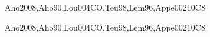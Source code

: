 \begin{syllabus}
\begin{unit}{\PLLanguageTranslationandExecution}{}{Aho2008,Aho90,Lou004CO,Teu98,Lem96,Appe002}{10}{C8}
\begin{topics}%
	\item \PLLanguageTranslationandExecutionTopicInterpretation
	\item \PLLanguageTranslationandExecutionTopicLanguage
	\item \PLLanguageTranslationandExecutionTopicRun
	\item \PLLanguageTranslationandExecutionTopicRunTime
	\item \PLLanguageTranslationandExecutionTopicMemory
\end{topics}
\begin{learningoutcomes}
	\item \PLLanguageTranslationandExecutionLODistinguishA [\Assessment]
	\item \PLLanguageTranslationandExecutionLODistinguishSyntax [\Assessment]
	\item \PLLanguageTranslationandExecutionLOSketch [\Assessment]
	\item \PLLanguageTranslationandExecutionLOExplainHowImplementations [\Assessment]
	\item \PLLanguageTranslationandExecutionLOIdentifyAndLeaks [\Assessment]
	\item \PLLanguageTranslationandExecutionLODiscussTheLimitations [\Assessment]
\end{learningoutcomes}
\end{unit}

\begin{unit}{\PLSyntaxAnalysis}{}{Aho2008,Aho90,Lou004CO,Teu98,Lem96,Appe002}{10}{C8}
\begin{topics}%
	\item \PLSyntaxAnalysisTopicScanning
	\item \PLSyntaxAnalysisTopicParsing
	\item \PLSyntaxAnalysisTopicGenerating
\end{topics}
\begin{learningoutcomes}
  	\item \PLSyntaxAnalysisLOUseFormalSpecify [\Assessment]
	\item \PLSyntaxAnalysisLOUseDeclarative [\Assessment]
	\item \PLSyntaxAnalysisLOIdentifyKey [\Assessment]
\end{learningoutcomes}
\end{unit}


\end{syllabus}
